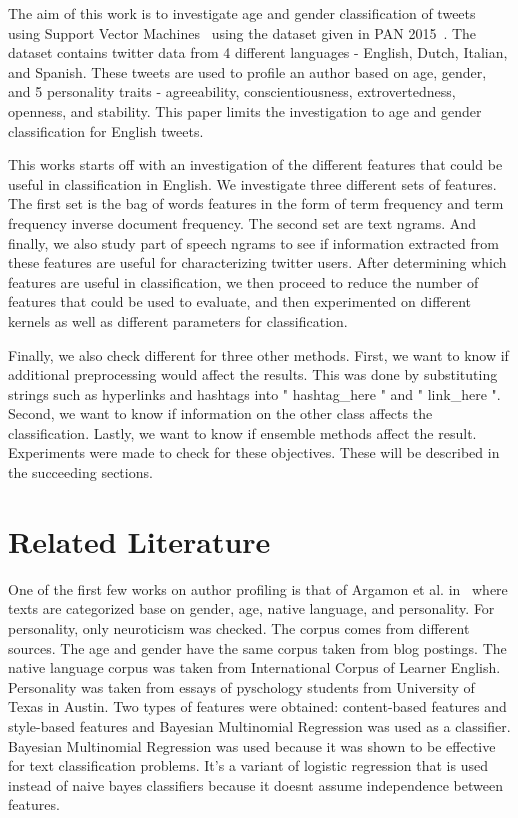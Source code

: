\documentclass[a4paper]{llncs}
\begin{document}
The aim of this work is to investigate age and gender classification of tweets using Support Vector Machines~\cite{cortes1995support} using the dataset given in PAN 2015~\cite{rangel:2015}. The dataset contains twitter data from 4 different languages - English, Dutch, Italian, and Spanish. These tweets are used to profile an author based on age, gender, and 5 personality traits - agreeability, conscientiousness, extrovertedness, openness, and stability. This paper limits the investigation to age and gender classification for English tweets.   

This works starts off with an investigation of the different features that could be useful in classification in English. We investigate three different sets of features. The first set is the bag of words features in the form of term frequency and term frequency inverse document frequency. The second set are text ngrams. And finally, we also study part of speech ngrams to see if information extracted from these features are useful for characterizing twitter users. After determining which features are useful in classification, we then proceed to reduce the number of features that could be used to evaluate, and then experimented on different kernels as well as different parameters for classification.

Finally, we also check different for three other methods. First, we want to know if additional preprocessing would affect the results. This was done by substituting strings such as hyperlinks and hashtags into " hashtag\_here " and " link\_here ". Second, we want to know if information on the other class affects the classification. Lastly, we want to know if ensemble methods affect the result. Experiments were made to check for these objectives. These will be described in the succeeding sections. 


\section{Related Literature}
One of the first few works on author profiling is that of Argamon et al. in~\cite{argamon2009automatically} where texts are categorized base on gender, age, native language, and personality. For personality, only neuroticism was checked. The corpus comes from different sources. The age and gender have the same corpus taken from blog postings. The native language corpus was taken from International Corpus of Learner English. Personality was taken from essays of pyschology students from University of Texas in Austin. Two types of features were obtained: content-based features and style-based features and Bayesian Multinomial Regression was used as a classifier. Bayesian Multinomial Regression was used because it was shown to be effective for text classification problems. It's a variant of logistic regression that is used instead of naive bayes classifiers because it doesnt assume independence between features.
\end{document}
